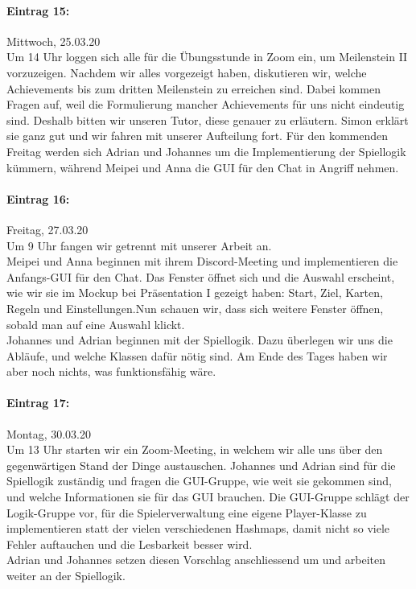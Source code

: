 \documentclass[12pt]{article}
\begin{document}
\paragraph{Eintrag 15:}
Mittwoch, 25.03.20\\
Um 14 Uhr loggen sich alle f\"ur die \"Ubungsstunde in Zoom ein, um Meilenstein II vorzuzeigen. Nachdem wir alles vorgezeigt haben, diskutieren wir, welche Achievements bis zum dritten Meilenstein zu erreichen sind. Dabei kommen Fragen auf, weil die Formulierung mancher Achievements f\"ur uns nicht eindeutig sind. Deshalb bitten wir unseren Tutor, diese genauer zu erl\"autern. Simon erkl\"art sie ganz gut und wir fahren mit unserer Aufteilung fort. F\"ur den kommenden Freitag werden sich Adrian und Johannes um die Implementierung der Spiellogik k\"ummern, w\"ahrend Meipei und Anna die GUI f\"ur den Chat in Angriff nehmen. 

\paragraph{Eintrag 16:}
Freitag, 27.03.20\\
Um 9 Uhr fangen wir getrennt mit unserer Arbeit an.\\
Meipei und Anna beginnen mit ihrem Discord-Meeting und implementieren die Anfangs-GUI f\"ur den Chat. Das Fenster \"offnet sich und die Auswahl erscheint, wie wir sie im Mockup bei Pr\"asentation I gezeigt haben: Start, Ziel, Karten, Regeln und Einstellungen.Nun schauen wir, dass sich weitere Fenster \"offnen, sobald man auf eine Auswahl klickt.\\
Johannes und Adrian beginnen mit der Spiellogik. Dazu \"uberlegen wir uns die Abl\"aufe, und welche Klassen daf\"ur n\"otig sind. Am Ende des Tages haben wir aber noch nichts, was funktionsf\"ahig w\"are.

\paragraph{Eintrag 17:}
Montag, 30.03.20\\
Um 13 Uhr starten wir ein Zoom-Meeting, in welchem wir alle uns \"uber den gegenw\"artigen Stand der Dinge austauschen. Johannes und Adrian sind f\"ur die Spiellogik zust\"andig und fragen die GUI-Gruppe, wie weit sie gekommen sind, und welche Informationen sie f\"ur das GUI brauchen. Die GUI-Gruppe schl\"agt der Logik-Gruppe vor, f\"ur die Spielerverwaltung eine eigene Player-Klasse zu implementieren statt der vielen verschiedenen Hashmaps, damit nicht so viele Fehler auftauchen und die Lesbarkeit besser wird.\\
Adrian und Johannes setzen diesen Vorschlag anschliessend um und arbeiten weiter an der Spiellogik.
\end{document}

